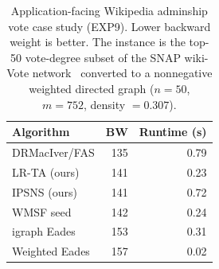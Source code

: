 \begin{table}[t]
\centering\small
\caption{Application-facing Wikipedia adminship vote case study (EXP9).
Lower backward weight is better.
The instance is the top-50 vote-degree subset of the SNAP wiki-Vote
network~\cite{LHK10WikiVote} converted to a nonnegative weighted directed
graph ($n{=}50$, $m{=}752$, density $= 0.307$).}
\label{tab:application-case}
\begin{tabular}{lrr}
\toprule
Algorithm & BW & Runtime (s) \\
\midrule
DRMacIver/FAS & 135 & 0.79 \\
LR-TA (ours)  & 141 & 0.23 \\
IPSNS (ours)  & 141 & 0.72 \\
WMSF seed     & 142 & 0.24 \\
igraph Eades  & 153 & 0.31 \\
Weighted Eades & 157 & 0.02 \\
\bottomrule
\end{tabular}
\end{table}
